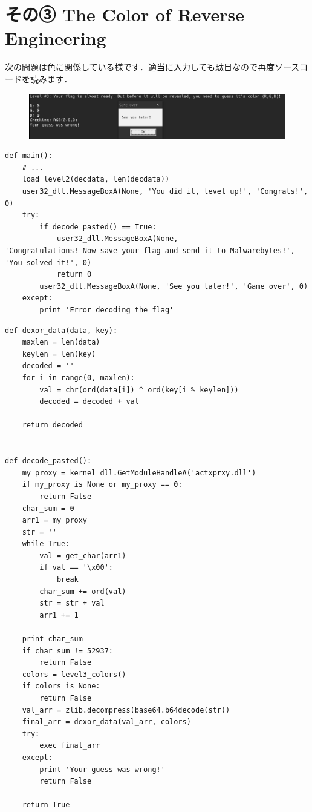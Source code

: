 \section{その③ The Color of Reverse Engineering}
次の問題は色に関係している様です．適当に入力しても駄目なので再度ソースコードを読みます．
\begin{figure}[H]
    \centering
    \includegraphics[width=\linewidth]{./assets/takuzoo3868asset/fail_level3_gray.png}
    \label{fig:gameover}
\end{figure}
\begin{tcolorbox}[sharp corners, left=2mm]\scriptsize
\begin{verbatim}
def main():
    # ...
    load_level2(decdata, len(decdata))
    user32_dll.MessageBoxA(None, 'You did it, level up!', 'Congrats!', 0)
    try:
        if decode_pasted() == True:
            user32_dll.MessageBoxA(None, 
'Congratulations! Now save your flag and send it to Malwarebytes!', 'You solved it!', 0)
            return 0
        user32_dll.MessageBoxA(None, 'See you later!', 'Game over', 0)
    except:
        print 'Error decoding the flag'
\end{verbatim}
\end{tcolorbox}
\begin{tcolorbox}[sharp corners, left=2mm]\scriptsize
\begin{verbatim}
def dexor_data(data, key):
    maxlen = len(data)
    keylen = len(key)
    decoded = ''
    for i in range(0, maxlen):
        val = chr(ord(data[i]) ^ ord(key[i % keylen]))
        decoded = decoded + val

    return decoded


def decode_pasted():
    my_proxy = kernel_dll.GetModuleHandleA('actxprxy.dll')
    if my_proxy is None or my_proxy == 0:
        return False
    char_sum = 0
    arr1 = my_proxy
    str = ''
    while True:
        val = get_char(arr1)
        if val == '\x00':
            break
        char_sum += ord(val)
        str = str + val
        arr1 += 1

    print char_sum
    if char_sum != 52937:
        return False
    colors = level3_colors()
    if colors is None:
        return False
    val_arr = zlib.decompress(base64.b64decode(str))
    final_arr = dexor_data(val_arr, colors)
    try:
        exec final_arr
    except:
        print 'Your guess was wrong!'
        return False

    return True
\end{verbatim}
\end{tcolorbox}
